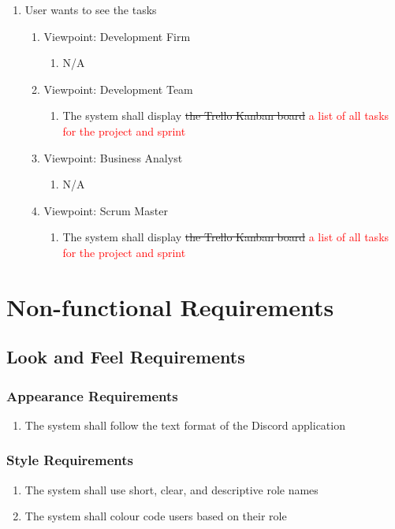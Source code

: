 \documentclass[12pt, titlepage]{article}
\begin{document}
\begin{enumerate}[{BE}1.]
	\item User wants to see the tasks
	\begin{enumerate}[{VP}1.] 
	    \item Viewpoint: Development Firm
	        \begin{enumerate}
	            \item[] N/A
	        \end{enumerate}
	    \item Viewpoint: Development Team
	        \begin{enumerate}
	            \item The system shall display \sout{the Trello Kanban board} \textcolor{red}{a list of all tasks for the project and sprint}
	        \end{enumerate}
		\item Viewpoint: Business Analyst
			\begin{enumerate}
	            \item[] N/A
			\end{enumerate}
		\item Viewpoint: Scrum Master
			\begin{enumerate}
	            \item The system shall display \sout{the Trello Kanban board} \textcolor{red}{a list of all tasks for the project and sprint}
			\end{enumerate}
	\end{enumerate}
\end{enumerate}


\section{Non-functional Requirements}

\subsection{Look and Feel Requirements}
\subsubsection{Appearance Requirements}
\begin{enumerate}[start=1, label={LF\arabic*.}]
    \item The system shall follow the text format of the Discord application
\end{enumerate}

\subsubsection{Style Requirements}
\begin{enumerate}[start=2, label={LF\arabic*.}]
    \item The system shall use short, clear, and descriptive role names
    \item The system shall colour code users based on their role
\end{enumerate}
\end{document}
